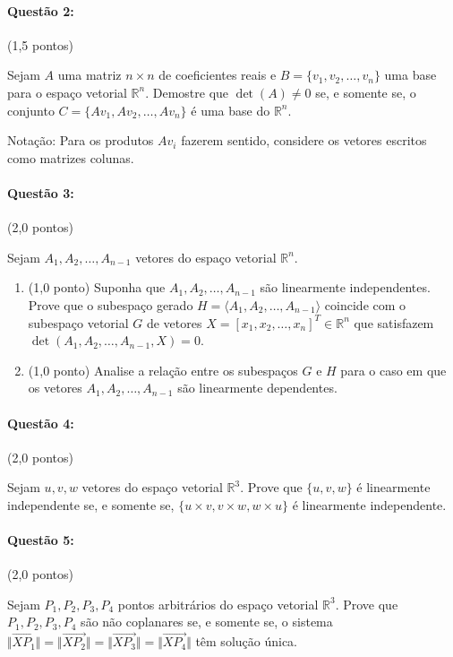\documentclass[12pt,a4paper]{article}
\newcommand{\norm}[1]{\Vert #1 \Vert}
\begin{document}
\paragraph{Questão 2:} (1,5 pontos)

Sejam $A$ uma matriz $n \times n$ de coeficientes reais e $B=\{v_1,v_2,\dots,v_n\}$ uma base para o espaço vetorial $\mathbb{R}^n$. Demostre que $\det (A) \neq 0$ se, e somente se, o conjunto $C=\{Av_1,Av_2,\dots,Av_n\}$ é uma base do $\mathbb{R}^n$.

Notação: Para os produtos $Av_i$ fazerem sentido, considere os vetores escritos como matrizes colunas.

\paragraph{Questão 3:} (2,0 pontos)

Sejam $A_1,A_2,\dots,A_{n-1}$ vetores do espaço vetorial $\mathbb{R}^n$.
\begin{enumerate}[label=(\alph*)]

\item (1,0 ponto) Suponha que $A_1,A_2,\dots,A_{n-1}$ são linearmente independentes. Prove que o subespaço gerado $H=\langle A_1,A_2,\dots,A_{n-1} \rangle$ coincide com o subespaço vetorial $G$ de vetores $X=[x_1,x_2,\dots,x_n]^T \in \mathbb{R}^n$ que satisfazem $\det (A_1,A_2,\dots,A_{n-1},X) = 0$. 

\item (1,0 ponto) Analise a relação entre os subespaços $G$ e $H$ para o caso em que os vetores $A_1,A_2,\dots,A_{n-1}$ são linearmente dependentes.

\end{enumerate}

\paragraph{Questão 4:} (2,0 pontos)

Sejam $u,v,w$ vetores do espaço vetorial $\mathbb{R}^3$. Prove que $\{u,v,w\}$ é linearmente independente se, e somente se, $\{u\times v, v\times w, w\times u\}$ é linearmente independente.

\paragraph{Questão 5:} (2,0 pontos)

Sejam $P_1,P_2,P_3,P_4$ pontos arbitrários do espaço vetorial $\mathbb{R}^3$. Prove que $P_1,P_2,P_3,P_4$ são não coplanares se, e somente se, o sistema $\norm{\overrightarrow{XP_1}}=\norm{\overrightarrow{XP_2}}=\norm{\overrightarrow{XP_3}}=\norm{\overrightarrow{XP_4}}$ têm solução única.
\end{document}

